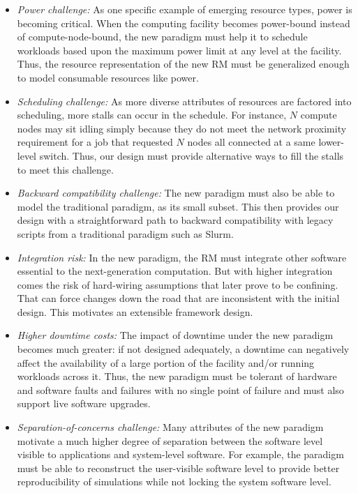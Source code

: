 \documentclass{article}
\newcommand{\slurm}{Slurm}
\begin{document}
\begin{itemize}
\item{\sl Power challenge:} As one specific example of emerging resource types,
      power is becoming critical. When the computing
      facility becomes power-bound instead of compute-node-bound, the new
      paradigm must help it to schedule workloads based upon the 
      maximum power limit at any level at the facility. Thus, 
      the resource representation of the new RM must be generalized
      enough to model consumable resources like power.  
      
\item{\sl Scheduling challenge:} As more diverse attributes of resources
      are factored into scheduling, more stalls can occur in the schedule.
      For instance, $N$ compute nodes may sit idling simply because they do not meet
      the network proximity requirement for a job that requested 
      $N$ nodes all connected at a same lower-level switch. Thus, our design 
      must provide alternative ways to fill the stalls to meet this 
      challenge.

\item{\sl Backward compatibility challenge:} The new paradigm must also be
      able to model the traditional paradigm, as its small subset. This
      then provides our design with a straightforward path to 
      backward compatibility with legacy scripts from a traditional 
      paradigm such as \slurm.

\item{\sl Integration risk:} In the new paradigm, the RM must 
     integrate other software essential to the next-generation computation. 
     But with higher integration comes the risk of hard-wiring assumptions
     that later prove to be confining. That can force changes down the road
     that are inconsistent with the initial design. This motivates
     an extensible framework design. 
     
\item{\sl Higher downtime costs:} The impact of downtime under the 
     new paradigm becomes much greater: if not designed adequately, 
     a downtime can negatively affect the availability of
     a large portion of the facility and/or running workloads across it.
     Thus, the new paradigm must be tolerant of hardware and software faults 
     and failures with no single point of failure and must also support 
     live software upgrades.

\item{\sl Separation-of-concerns challenge:} Many attributes of the new
     paradigm motivate a much higher degree of separation between
     the software level visible to applications and system-level 
     software. For example, the paradigm must be able to reconstruct the user-visible
     software level to provide better reproducibility of simulations while not
     locking the system software level. 
   

\end{itemize}
\end{document}
